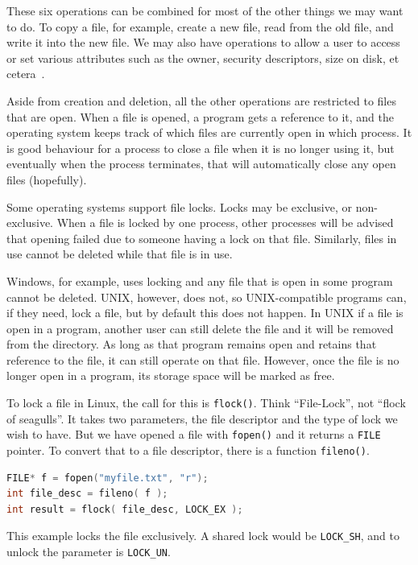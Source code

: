 \documentclass[a4paper]{report}
\begin{document}
These six operations can be combined for most of the other things we may want to do. To copy a file, for example, create a new file, read from the old file, and write it into the new file. We may also have operations to allow a user to access or set various attributes such as the owner, security descriptors, size on disk, et cetera~\cite{osc}.

Aside from creation and deletion, all the other operations are restricted to files that are open. When a file is opened, a program gets a reference to it, and the operating system keeps track of which files are currently open in which process. It is good behaviour for a process to close a file when it is no longer using it, but eventually when the process terminates, that will automatically close any open files (hopefully).

Some operating systems support file locks. Locks may be exclusive, or non-exclusive. When a file is locked by one process, other processes will be advised that opening failed due to someone having a lock on that file. Similarly, files in use cannot be deleted while that file is in use.

Windows, for example, uses locking and any file that is open in some program cannot be deleted. UNIX, however, does not, so UNIX-compatible programs can, if they need, lock a file, but by default this does not happen. In UNIX if a file is open in a program, another user can still delete the file and it will be removed from the directory. As long as that program remains open and retains that reference to the file, it can still operate on that file. However, once the file is no longer open in a program, its storage space will be marked as free.

To lock a file in Linux, the call for this is \texttt{flock()}. Think ``File-Lock'', not ``flock of seagulls''. It takes two parameters, the file descriptor and the type of lock we wish to have. But we have opened a file with \texttt{fopen()} and it returns a \texttt{FILE} pointer. To convert that to a file descriptor, there is a function \texttt{fileno()}.

\begin{lstlisting}[language=C]
FILE* f = fopen("myfile.txt", "r");
int file_desc = fileno( f );
int result = flock( file_desc, LOCK_EX );
\end{lstlisting}

This example locks the file exclusively. A shared lock would be \texttt{LOCK\_SH}, and to unlock the parameter is \texttt{LOCK\_UN}.
\end{document}
